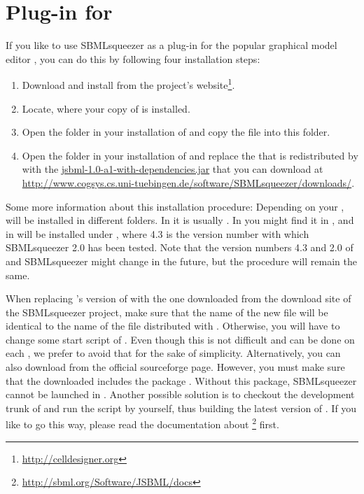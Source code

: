 \section{Plug-in for \CellDesigner}
\label{sec:CellDesignerInstall}

If you like to use SBMLsqueezer as a plug-in for the popular graphical model
editor \CellDesigner \citep{Funahashi2003, Funahashi2006, Funahashi2007a, Funahashi2008}, you can do this by following four installation steps:
\begin{enumerate}
  \item Download and install \CellDesigner from the project's website\footnote{\url{http://celldesigner.org}}.
  \item Locate, where your copy of \CellDesigner is installed. 
  \item Open the  folder in your installation of \CellDesigner and
        copy the file  into this folder.
  \item Open the  folder in your installation of \CellDesigner and
        replace the \JSBML \JAR that is redistributed by \CellDesigner with
        the \JAR \href{http://www.cogsys.cs.uni-tuebingen.de/software/SBMLsqueezer/downloads/jsbml-1.0-a1-with-dependencies.jar}{\url{jsbml-1.0-a1-with-dependencies.jar}}
        that you can download at \url{http://www.cogsys.cs.uni-tuebingen.de/software/SBMLsqueezer/downloads/}.
\end{enumerate}
Some more information about this installation procedure:
Depending on your \OS, \CellDesigner will be installed in different folders.
In \Windows it is usually
.
In \Linux you might find it in , and in \MacOSX \CellDesigner will be installed under
, where 4.3 is the version number with which SBMLsqueezer 2.0 has been tested.
Note that the version numbers 4.3 and 2.0 of \CellDesigner and SBMLsqueezer might change in the future, but the procedure will remain the same.

When replacing \CellDesigner's version of \JSBML with the one downloaded from the download site of the SBMLsqueezer project, 
make sure that the name of the new \JSBML file will be identical to the name of the \JSBML file distributed with \CellDesigner.
Otherwise, you will have to change some start script of \CellDesigner.
Even though this is not difficult and can be done on each \OS, we prefer to avoid that for the sake of simplicity.
Alternatively, you can also download \JSBML from the official sourceforge page.
However, you must make sure that the downloaded \JAR includes the package .
Without this package, SBMLsqueezer cannot be launched in \CellDesigner.
Another possible solution is to checkout the development trunk of \JSBML and run the \ant script by yourself, thus building the latest version of \JSBML.
If you like to go this way, please read the documentation about \JSBML\footnote{\url{http://sbml.org/Software/JSBML/docs}} first.

